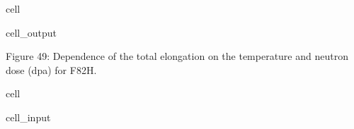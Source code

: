 \documentclass[letterpaper,10pt,english]{jupyterBook}
\begin{document}
\begin{sphinxuseclass}{cell}
\begin{sphinxVerbatimOutput}
\begin{sphinxuseclass}{cell_output}
\begin{sphinxVerbatim}
				\end{sphinxVerbatim}
				
				\noindent{}
				
		\end{sphinxuseclass}\end{sphinxVerbatimOutput}
		
	\end{sphinxuseclass}
	\sphinxAtStartPar
	Figure 49: Dependence of the total elongation on the temperature and neutron dose (dpa) for F82H.
	
	\begin{sphinxuseclass}{cell}\begin{sphinxVerbatimInput}
			
			\begin{sphinxuseclass}{cell_input}
				\begin{sphinxVerbatim}[commandchars=\\\{\}]
					    
					   
					    
					 
					

\end{sphinxVerbatim}
\end{sphinxuseclass}
\end{sphinxVerbatimInput}
\end{sphinxuseclass}
\end{document}
